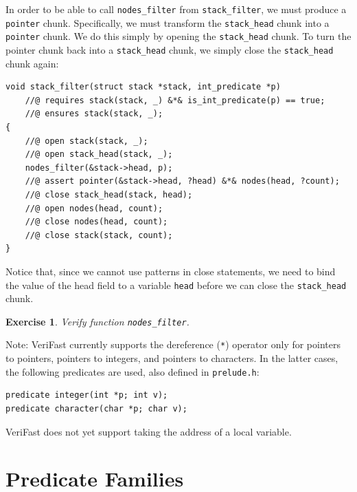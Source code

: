 \documentclass{article}
\newtheorem{exercise}{Exercise}
\begin{document}
In order to be able to call \lstinline!nodes_filter! from
\lstinline!stack_filter!, we must produce a \lstinline!pointer!
chunk. Specifically, we must transform the
\lstinline!stack_head! chunk into a \lstinline!pointer! chunk.
We do this simply by opening the \lstinline!stack_head! chunk.
To turn the pointer chunk back into a \lstinline!stack_head!
chunk, we simply close the \lstinline!stack_head! chunk again:
\begin{lstlisting}
void stack_filter(struct stack *stack, int_predicate *p)
    //@ requires stack(stack, _) &*& is_int_predicate(p) == true;
    //@ ensures stack(stack, _);
{
    //@ open stack(stack, _);
    //@ open stack_head(stack, _);
    nodes_filter(&stack->head, p);
    //@ assert pointer(&stack->head, ?head) &*& nodes(head, ?count);
    //@ close stack_head(stack, head);
    //@ open nodes(head, count);
    //@ close nodes(head, count);
    //@ close stack(stack, count);
}
\end{lstlisting}
Notice that, since we cannot use patterns in close statements,
we need to bind the value of the head field to a variable
\lstinline!head! before we can close the \lstinline!stack_head!
chunk.

\begin{exercise}\label{exercise:byref}
Verify function \lstinline!nodes_filter!.
\end{exercise}

Note: VeriFast currently supports the dereference
(\lstinline!*!) operator only for pointers to pointers,
pointers to integers, and pointers to characters.
In the latter cases, the following
predicates are used, also defined in \texttt{prelude.h}:
\begin{lstlisting}
predicate integer(int *p; int v);
predicate character(char *p; char v);
\end{lstlisting}
VeriFast does not yet support taking the address of a local
variable.

\section{Predicate Families}\label{section:predicate-families}
\end{document}

